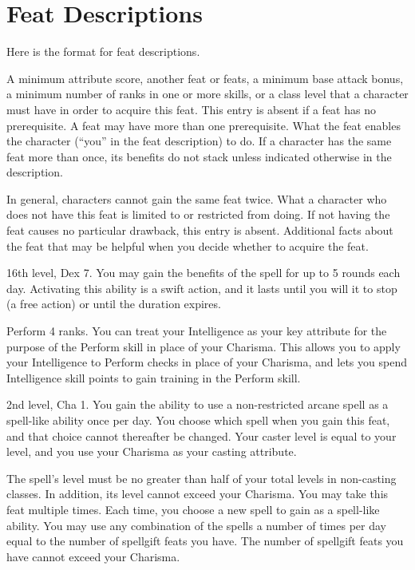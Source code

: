 \twocolumn

\section{Feat Descriptions}
Here is the format for feat descriptions.

 A minimum attribute score, another feat or feats, a minimum base attack bonus, a minimum number of ranks in one or more skills, or a class level that a character must have in order to acquire this feat. This entry is absent if a feat has no prerequisite. A feat may have more than one prerequisite.
 What the feat enables the character (``you'' in the feat description) to do. If a character has the same feat more than once, its benefits do not stack unless indicated otherwise in the description.
\par In general, characters cannot gain the same feat twice.
 What a character who does not have this feat is limited to or restricted from doing. If not having the feat causes no particular drawback, this entry is absent.
 Additional facts about the feat that may be helpful when you decide whether to acquire the feat.

\featpre 16th level, Dex 7.
\featben You may gain the benefits of the  spell for up to 5 rounds each day. Activating this ability is a swift action, and it lasts until you will it to stop (a free action) or until the duration expires.

\featpre Perform 4 ranks.
\featben You can treat your Intelligence as your key attribute for the purpose of the Perform skill in place of your Charisma. This allows you to apply your Intelligence to Perform checks in place of your Charisma, and lets you spend Intelligence skill points to gain training in the Perform skill.

\featpre 2nd level, Cha 1.
\featben You gain the ability to use a non-restricted arcane spell as a spell-like ability once per day. You choose which spell when you gain this feat, and that choice cannot thereafter be changed. Your caster level is equal to your level, and you use your Charisma as your casting attribute.

The spell's level must be no greater than half of your total levels in non-casting classes. In addition, its level cannot exceed your Charisma.
 You may take this feat multiple times. Each time, you choose a new spell to gain as a spell-like ability. You may use any combination of the spells a number of times per day equal to the number of spellgift feats you have. The number of spellgift feats you have cannot exceed your Charisma.

